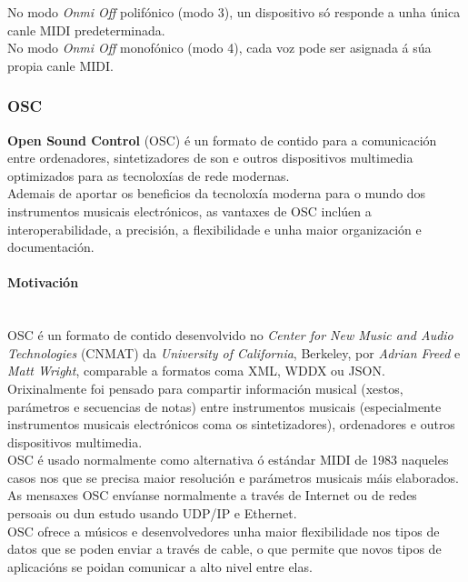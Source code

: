     No modo \textit{Onmi Off} polifónico (modo 3), un dispositivo só responde a
    unha única canle MIDI predeterminada. \\

    No modo \textit{Onmi Off} monofónico (modo 4), cada voz pode ser asignada á
    súa propia canle MIDI.

  \subsubsection{OSC}

  \textbf{Open Sound Control} (OSC) \cite{OSC} é un formato de contido para a
  comunicación entre ordenadores, sintetizadores de son e outros dispositivos
  multimedia optimizados para as tecnoloxías de rede modernas. \\

  Ademais de aportar os beneficios da tecnoloxía moderna para o mundo dos
  instrumentos musicais electrónicos, as vantaxes de OSC inclúen a
  interoperabilidade, a precisión, a flexibilidade e unha maior organización e
  documentación.

  \paragraph{Motivación}\mbox{}\\

  OSC é un formato de contido desenvolvido no
  \textit{Center for New Music and Audio Technologies} (CNMAT) da
  \textit{University of California}, Berkeley, por \textit{Adrian Freed} e
  \textit{Matt Wright}, comparable a formatos coma XML, WDDX ou JSON. \\

  Orixinalmente foi pensado para compartir información musical (xestos,
  parámetros e secuencias de notas) entre instrumentos musicais (especialmente
  instrumentos musicais electrónicos coma os sintetizadores), ordenadores e
  outros dispositivos multimedia. \\

  OSC é usado normalmente como alternativa ó estándar MIDI de 1983 naqueles
  casos nos que se precisa maior resolución e parámetros musicais máis
  elaborados. \\

  As mensaxes OSC envíanse normalmente a través de Internet ou de redes
  persoais ou dun estudo usando UDP/IP e Ethernet. \\

  OSC ofrece a músicos e desenvolvedores unha maior flexibilidade nos tipos de
  datos que se poden enviar a través de cable, o que permite que novos tipos de
  aplicacións se poidan comunicar a alto nivel entre elas.

